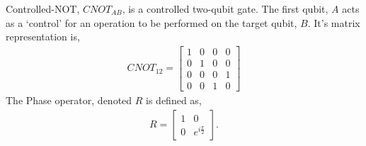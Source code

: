 Controlled-NOT, $CNOT_{AB}$, is a controlled two-qubit gate. The first qubit, $A$ acts as a `control' for an operation to be 
performed on the target qubit, $B$. It's matrix representation is, 
\begin{align*}
    CNOT_{12} = \begin{bmatrix}
        1 & 0 & 0 & 0 \\
        0 & 1 & 0 & 0 \\
        0 & 0 & 0 & 1 \\
        0 & 0 & 1 & 0
        \end{bmatrix}
\end{align*}
The Phase operator, denoted $R$ is defined as,
\begin{align*}
    R =
    \begin{bmatrix}
        1 & 0                  \\
        0 & e^{i\frac{\pi}{2}}
    \end{bmatrix}.
\end{align*}








